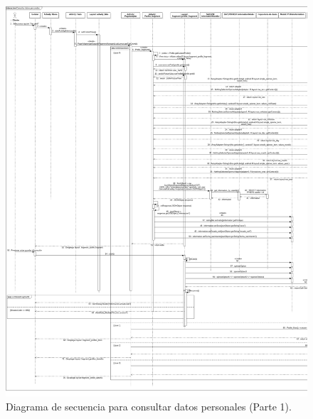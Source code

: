\FloatBarrier
\begin{figure}[htbp!]
		\centering
			\includegraphics[width=1 \textwidth]{imagenes/Diagramas_UserApp/Nuevos_diagramas/VerPerfil_1}
		\caption{Diagrama de secuencia para consultar datos personales (Parte 1).}
		\label{image:consulta2}
\end{figure}
\FloatBarrier


